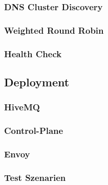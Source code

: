 \subsubsection{DNS Cluster Discovery}
\subsubsection{Weighted Round Robin}
\subsubsection{Health Check}

\subsection{Deployment}
\subsubsection{HiveMQ}
\subsubsection{Control-Plane}
\subsubsection{Envoy}
\subsubsection{Test Szenarien}

